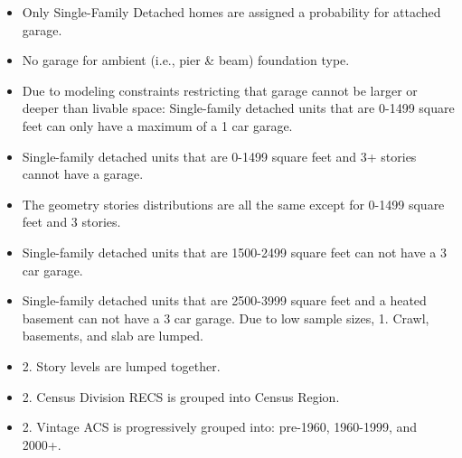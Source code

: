 \begin{itemize}
\item Only Single-Family Detached homes are assigned a probability for attached garage.
\item No garage for ambient (i.e., pier & beam) foundation type.
\item Due to modeling constraints restricting that garage cannot be larger or deeper than livable space: Single-family detached units that are 0-1499 square feet can only have a maximum of a 1 car garage.
\item Single-family detached units that are 0-1499 square feet and 3+ stories cannot have a garage.
\item The geometry stories distributions are all the same except for 0-1499 square feet and 3 stories.
\item Single-family detached units that are 1500-2499 square feet can not have a 3 car garage.
\item Single-family detached units that are 2500-3999 square feet and a heated basement can not have a 3 car garage. Due to low sample sizes, 1. Crawl, basements, and slab are lumped.
\item 2. Story levels are lumped together.
\item 2. Census Division RECS is grouped into Census Region.
\item 2. Vintage ACS is progressively grouped into: pre-1960, 1960-1999, and 2000+.
\end{itemize}
